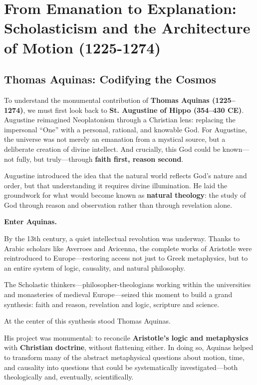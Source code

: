 \section{From Emanation to Explanation: Scholasticism and the Architecture of Motion (1225-1274)}

\subsection{Thomas Aquinas: Codifying the Cosmos}

To understand the monumental contribution of \textbf{Thomas Aquinas (1225–1274)}, we must first look back to \textbf{St. Augustine of Hippo (354–430 CE)}. Augustine reimagined Neoplatonism through a Christian lens: replacing the impersonal ``One'' with a personal, rational, and knowable God. For Augustine, the universe was not merely an emanation from a mystical source, but a deliberate creation of divine intellect. And crucially, this God could be known—not fully, but truly—through \textbf{faith first, reason second}.

Augustine introduced the idea that the natural world reflects God's nature and order, but that understanding it requires divine illumination. He laid the groundwork for what would become known as \textbf{natural theology}: the study of God through reason and observation rather than through revelation alone.

\textbf{Enter Aquinas.}

By the 13th century, a quiet intellectual revolution was underway. Thanks to Arabic scholars like Averroes and Avicenna, the complete works of Aristotle were reintroduced to Europe—restoring access not just to Greek metaphysics, but to an entire system of logic, causality, and natural philosophy. 

The Scholastic thinkers—philosopher-theologians working within the universities and monasteries of medieval Europe—seized this moment to build a grand synthesis: faith and reason, revelation and logic, scripture and science.

At the center of this synthesis stood Thomas Aquinas.

His project was monumental: to reconcile \textbf{Aristotle’s logic and metaphysics} with \textbf{Christian doctrine}, without flattening either. In doing so, Aquinas helped to transform many of the abstract metaphysical questions about motion, time, and causality into questions that could be systematically investigated—both theologically and, eventually, scientifically.


